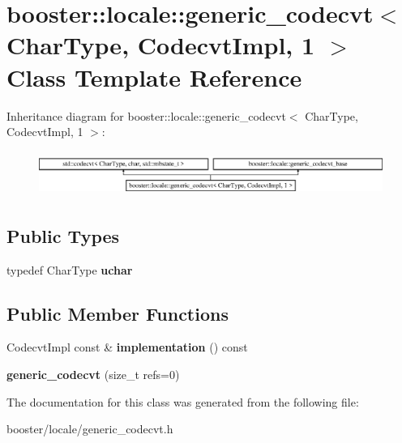 \section{booster\+:\+:locale\+:\+:generic\+\_\+codecvt$<$ Char\+Type, Codecvt\+Impl, 1 $>$ Class Template Reference}
\label{classbooster_1_1locale_1_1generic__codecvt_3_01CharType_00_01CodecvtImpl_00_011_01_4}
Inheritance diagram for booster\+:\+:locale\+:\+:generic\+\_\+codecvt$<$ Char\+Type, Codecvt\+Impl, 1 $>$\+:\begin{figure}[H]
\begin{center}
\leavevmode
\includegraphics[height=1.485411cm]{classbooster_1_1locale_1_1generic__codecvt_3_01CharType_00_01CodecvtImpl_00_011_01_4}
\end{center}
\end{figure}
\subsection*{Public Types}
\begin{DoxyCompactItemize}
\item 
typedef Char\+Type {\bfseries uchar}\label{classbooster_1_1locale_1_1generic__codecvt_3_01CharType_00_01CodecvtImpl_00_011_01_4_a6b2b1aaeb245d701a659f9f06b4e57d0}

\end{DoxyCompactItemize}
\subsection*{Public Member Functions}
\begin{DoxyCompactItemize}
\item 
Codecvt\+Impl const \& {\bfseries implementation} () const \label{classbooster_1_1locale_1_1generic__codecvt_3_01CharType_00_01CodecvtImpl_00_011_01_4_aa14e2936c25202ef615d8b4e931b2667}

\item 
{\bfseries generic\+\_\+codecvt} (size\+\_\+t refs=0)\label{classbooster_1_1locale_1_1generic__codecvt_3_01CharType_00_01CodecvtImpl_00_011_01_4_a8664e5af6cc0996d4ceeda904a09612d}

\end{DoxyCompactItemize}


The documentation for this class was generated from the following file\+:\begin{DoxyCompactItemize}
\item 
booster/locale/generic\+\_\+codecvt.\+h\end{DoxyCompactItemize}
